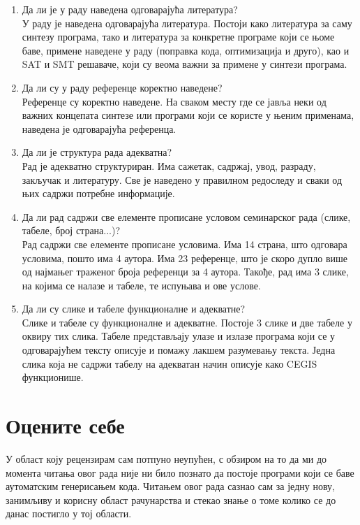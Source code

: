 \documentclass[a4paper]{report}
\begin{document}
\begin{enumerate}
\item Да ли је у раду наведена одговарајућа литература?\\
У раду је наведена одговарајућа литература. Постоји како литература за саму синтезу програма, тако и литература за конкретне програме који се њоме баве, примене наведене у раду (поправка кода, оптимизација и друго), као и SAT и SMT решаваче, који су веома важни за примене у синтези програма.

\item Да ли су у раду референце коректно наведене?\\
Референце су коректно наведене. На сваком месту где се јавља неки од важних концепата синтезе или програми који се користе у њеним применама, наведена је одговарајућа референца.

\item Да ли је структура рада адекватна?\\
Рад је адекватно структуриран. Има сажетак, садржај, увод, разраду, закључак и литературу. Све је наведено у правилном редоследу и сва\-ки од њих садржи потребне информације.

\item Да ли рад садржи све елементе прописане условом семинарског рада (слике, табеле, број страна...)?\\
Рад садржи све елементе прописане условима. Има 14 страна, што одговара условима, пошто има 4 аутора. Има 23 референце, што је скоро дупло више од најмањег траженог броја референци за 4 аутора. Такође, рад има 3 слике, на којима се налазе и табеле, те испуњава и ове услове.

\item Да ли су слике и табеле функционалне и адекватне?\\
Слике и табеле су функционалне и адекватне. Постоје 3 слике и две табеле у оквиру тих слика. Табеле представљају улазе и излазе програма који се у одговарајућем тексту описује и помажу лакшем разумевању текста. Једна слика која не садржи табелу на адекватан начин описује како CEGIS функционише.

\end{enumerate}

\section{Оцените себе}
\par У област коју рецензирам сам потпуно неупућен, с обзиром на то да ми до момента читања овог рада није ни било познато да постоје програми који се баве аутоматским генерисањем кода. Читањем овог рада сазнао сам за једну нову, занимљиву и корисну област рачунарства и стекао знање о томе колико се до данас постигло у тој области.
\end{document}
